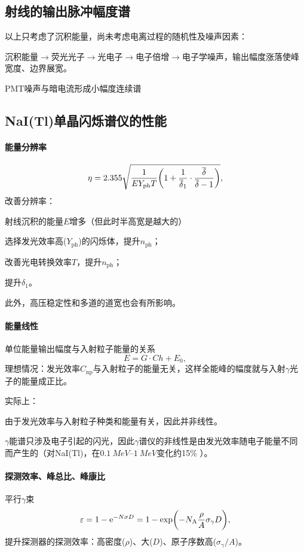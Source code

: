 \subsection{\textgamma 射线的输出脉冲幅度谱}

以上只考虑了沉积能量，尚未考虑电离过程的随机性及噪声因素：
\begin{compactitem}
	\item 沉积能量$\to$荧光光子$\to$光电子$\to$电子倍增$\to$电子学噪声，输出幅度涨落使峰宽度、边界展宽。
	\item PMT噪声与暗电流形成小幅度连续谱
\end{compactitem}

\subsection{NaI(Tl)单晶闪烁谱仪的性能}

\paragraph{能量分辨率}
\[
	\eta=2.355\sqrt{\frac1{EY_{\mathrm{ph}}T}\biggl(1+\frac1{\overline{\delta}_1}\cdot\frac{\overline{\delta}}{\overline{\delta}-1}\biggr)},
\]
改善分辨率：
\begin{compactenum}
	\item 射线沉积的能量$E$增多（但此时半高宽是越大的）
	\item 选择发光效率高($Y_{\mathrm{ph}}$)的闪烁体，提升$n_{\mathrm{ph}}$；
	\item 改善光电转换效率$T$，提升$n_{\mathrm{ph}}$；
	\item 提升$\delta_1$。
\end{compactenum}
此外，高压稳定性和多道的道宽也会有所影响。
\paragraph{能量线性}单位能量输出幅度与入射粒子能量的关系
\[
	E=G\cdot Ch+E_0,
\]
理想情况：发光效率$C_{\mathrm{np}}$与入射粒子的能量无关，这样全能峰的幅度就与入射$\gamma$光子的能量成正比。

实际上：
\begin{compactitem}
	\item 由于发光效率与入射粒子种类和能量有关，因此并非线性。
	\item $\gamma$能谱只涉及电子引起的闪光，因此$\gamma$谱仪的非线性是由发光效率随电子能量不同而产生的（对NaI(Tl)，在$\SIrange{0.1}{1}{MeV}$变化约15\% ）。
\end{compactitem}
\paragraph{探测效率、峰总比、峰康比}平行$\gamma$束
\[
	\varepsilon=1-\mathop{}\!\mathrm{e}^{-N\sigma D}=1-\exp\biggl(-N_{\mathrm A}\frac\rho{A}\sigma_\gamma D\biggr),
\]
提升探测器的探测效率：高密度($\rho$)、大($D$)、原子序数高($\sigma_\gamma/A$)。

